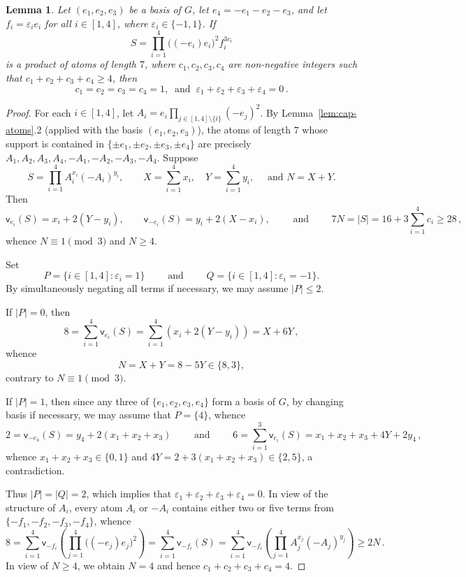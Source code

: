\documentclass[a4paper, 10pt]{amsart}
\theoremstyle{plain}
\newtheorem{lemma}[theorem]{\bf Lemma}
\theoremstyle{definition}
\theoremstyle{definition}
\numberwithin{equation}{section}
\begin{document}
\begin{lemma}\label{le-1}
	Let $(e_1,e_2,e_3)$ be a basis of $G$, let $e_4=-e_1-e_2-e_3$, and let
	$f_i=\varepsilon_ie_i$ for all $i\in [1,4]$, where $\varepsilon_i\in \{-1,1\}$.
	If
	\[
	S=\prod_{i=1}^4\bigl((-e_i)e_i\bigr)^2f_i^{3c_i}
	\]
	is a product of atoms of length $7$, where $c_1,c_2,c_3,c_4$ are non-negative integers such that $c_1+c_2+c_3+c_4\ge 4$,
	then
	\[
	c_1=c_2=c_3=c_4=1, \ \text{ and }\ \varepsilon_1+\varepsilon_2+\varepsilon_3+\varepsilon_4=0\,.
	\]
\end{lemma}

\begin{proof} 
For each $i\in [1,4]$, let $A_i=e_i\prod_{j\in [1,4]\setminus\{i\}}(-e_j)^2$.
	By  Lemma~\ref{lem:cap-atoms}.2 (applied with the basis $(e_1,e_2,e_3)$), the
	atoms of length $7$ whose support is contained in
	$\{\pm e_1, \pm e_2, \pm e_3, \pm e_4\}$ are precisely
	$A_1,A_2,A_3,A_4,-A_1,-A_2,-A_3,-A_4$.
	Suppose
	\[
	S=\prod_{i=1}^4 A_i^{x_i}(-A_i)^{y_i},
	\qquad
	X=\sum_{i=1}^4 x_i,\quad 
	Y=\sum_{i=1}^4 y_i,\quad \text{ and }
	N=X+Y.
	\]
	Then
	\[
	\mathsf v_{e_i}(S)=x_i+2(Y-y_i),
	\qquad
	\mathsf v_{-e_i}(S)=y_i+2(X-x_i),
	\qquad \text{ and } \qquad
	7N=|S|=16+3\sum_{i=1}^4 c_i\ge 28\,,
	\]
	whence $N\equiv1\pmod3$ and $N\ge 4$.
	
	Set
	\[
	P=\{i\in [1,4]\colon \varepsilon_i=1\}\qquad \text{ and }\qquad Q=\{i\in [1,4]\colon \varepsilon_i=-1\}.
	\]
	By simultaneously negating all terms if necessary, we may assume $|P|\le 2$.
	
	If $|P|=0$, then 
	\[
	8=\sum_{i=1}^4 \mathsf v_{e_i}(S)=\sum_{i=1}^4 (x_i+2(Y-y_i))=X+6Y\,,
	\]
	whence
	\[
	N=X+Y=8-5Y\in\{8,3\},
	\]
	contrary to $N\equiv1\pmod3$.
	
	If $|P|=1$, then since any three of $\{e_1,e_2,e_3,e_4\}$ form a basis of $G$, by changing basis if necessary, we may assume that  $P=\{4\}$, whence
	\[
	2=\mathsf v_{-e_4}(S)=y_4+2(x_1+x_2+x_3)\qquad \text{ and } \qquad
	6=\sum_{i = 1}^3 \mathsf v_{e_i}(S)=x_1+x_2+x_3+4Y+2y_4\,,
	\]
	whence $x_1+x_2+x_3\in \{0,1\}$ and $4Y=2+3(x_1+x_2+x_3)\in \{2,5\}$, a contradiction.
	
	Thus $|P|=|Q|=2$, which implies that $\varepsilon_1+\varepsilon_2+\varepsilon_3+\varepsilon_4=0$. In view of the structure of $A_i$, 
	every atom $A_i$ or $-A_i$ contains either two or five terms from
	$\{-f_1,-f_2,-f_3,-f_4\}$, whence
	\[
	8=\sum_{i=1}^4 \mathsf v_{-f_i}\left(\prod_{j=1}^4\bigl((-e_j)e_j\bigr)^2\right)=\sum_{i=1}^4 \mathsf v_{-f_i}(S)=\sum_{i=1}^4 \mathsf v_{-f_i}\left(\prod_{j=1}^4 A_j^{x_j}(-A_j)^{y_j}\right)\ge  2N\,.
	\]
	In view of  $N\ge 4$,
	we obtain $N=4$ and hence $c_1+c_2+c_3+c_4=4$.
	

\end{proof}
\end{document}

